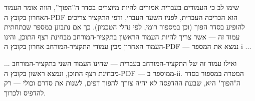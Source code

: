 {שימו לב כי העמודים בעברית אמורים להיות מיוצרים בסדר ה''הפוך'', הווה אומר העמוד האחרון בקובץ ה-\textenglish{PDF} הוא הכריכה העברית, לפניו השער העברי, ודפי התקציר צריכים להופיע בסדר הפוך (וכן במספור רומי, לפי נהלי הטכניון). כך אם נתבונן במספר שבתחתית עמוד זה \textenglish{---} אשר צריך להיות העמוד הראשון בתקציר-המורחב מבחינת רצף התוכן, והינו העמוד האחרון מבין עמודי התקציר-המורחב אחרון בקובץ ה-\textenglish{PDF} \textenglish{---} נמצא את המספר \textenglish{i} ...

\newpage

... ואילו עמוד זה של התקציר-המורחב בעברית \textenglish{---} שהינו העמוד השני בתקציר-המורחב מבחינת רצף התוכן, ונמצא ראשון בקובץ ה-\textenglish{PDF} \textenglish{---} ממוספר ב-\textenglish{ii}. המטרה במספור בסדר ה"הפוך" היא, שבעת ההדפסה לא יהיה צורך להפוך דפים, לשנות את סדרם וכולי \textenglish{---} רק להדפיס ולכרוך.

} %
